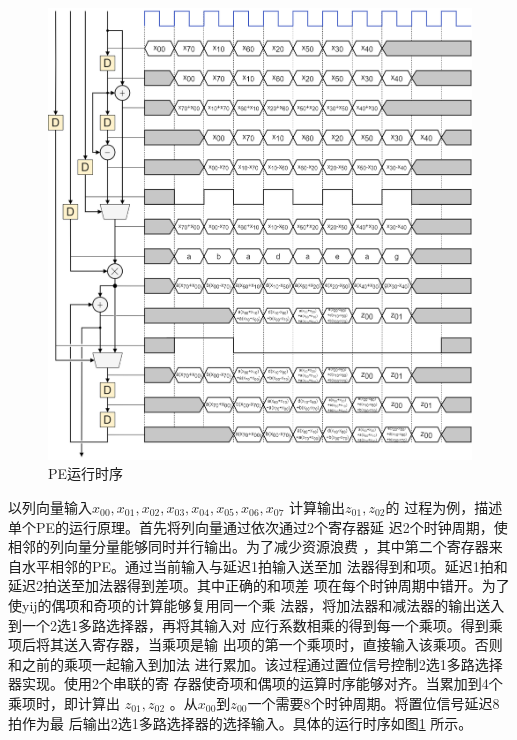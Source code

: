 \documentclass{article}
\numberwithin {equation}{section}
\begin{document}
\begin{spacing}{1.25}
      \begin{figure}[H]
        \centering
        \includegraphics[scale=0.35]{./pictures/PE时序.png}
        \caption{PE运行时序}
        \label{PE运行时序}
      \end{figure}
      以列向量输入$x_{00},x_{01},x_{02},x_{03},x_{04},x_{05},x_{06},x_{07}$
      计算输出$z_{01},z_{02}$的
      过程为例，描述单个PE的运行原理。首先将列向量通过依次通过2个寄存器延
      迟2个时钟周期，使相邻的列向量分量能够同时并行输出。为了减少资源浪费
      ，其中第二个寄存器来自水平相邻的PE。通过当前输入与延迟1拍输入送至加
      法器得到和项。延迟1拍和延迟2拍送至加法器得到差项。其中正确的和项差
      项在每个时钟周期中错开。为了使yij的偶项和奇项的计算能够复用同一个乘
      法器，将加法器和减法器的输出送入到一个2选1多路选择器，再将其输入对
      应行系数相乘的得到每一个乘项。得到乘项后将其送入寄存器，当乘项是输
      出项的第一个乘项时，直接输入该乘项。否则和之前的乘项一起输入到加法
      进行累加。该过程通过置位信号控制2选1多路选择器实现。使用2个串联的寄
      存器使奇项和偶项的运算时序能够对齐。当累加到4个乘项时，即计算出
      $z_{01},z_{02}$
      。从$x_{00}$到$z_{00}$一个需要8个时钟周期。将置位信号延迟8拍作为最
      后输出2选1多路选择器的选择输入。具体的运行时序如图\ref{PE运行时序}
      所示。


\end{spacing}
\end{document}
